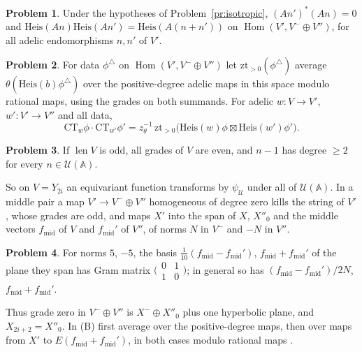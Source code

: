 \documentclass[reqno]{amsart}
\theoremstyle{definition}
\newtheorem{problem}{Problem}[section]
\theoremstyle{plain}
\theoremstyle{remark}
\newcommand{\A}{\mathbb{A}}
\newcommand{\Uc}{\mathcal{U}}
\newcommand{\Hom}{\operatorname{Hom}}
\newcommand{\Heis}{\mathrm{Heis}}
\newcommand{\CT}{\mathrm{CT}}
\newcommand{\zt}{\mathrm{zt}}
\newcommand{\len}{\operatorname{len}}
\newcommand{\fm}{f_{\mathrm{mid}}}
\begin{document}
\begin{problem}\label{pr:commute}
Under the hypotheses of Problem~\ref{pr:isotropic}, \((An')^*(An) = 0\) and \(\Heis(An)\Heis(An') = \Heis(A(n + n'))\) on \(\Hom(V', V^- \oplus V'')\), for all adelic endomorphisms \(n, n'\) of \(V'\).
\end{problem}

\begin{problem}\label{pr:ct-product}
For data \(\phi^\triangle\) on \(\Hom(V',V^-\oplus V'')\) let \(\zt_{>0}(\phi^\triangle)\) average \(\theta(\Heis(b)\phi^\triangle)\) over the positive-degree adelic maps in this space modulo rational maps, using the grades on both summands.  For adelic \(w:V\to V'\), \(w':V'\to V''\) and all data,
\[
  \CT_w \phi \cdot \CT_{w'} \phi' = z_\theta^{-1}\,\zt_{>0}\bigl(\Heis(w)\phi \boxtimes \Heis(w')\phi'\bigr) .
\]
\end{problem}

\begin{problem}\label{pr:odd}
If \(\len V\) is odd, all grades of \(V\) are even, and \(n - 1\) has degree \(\ge 2\) for every \(n \in \Uc(\A)\).
\end{problem}

So on \(V = Y_{2i}\) an equivariant function transforms by \(\psi_\Uc\) under all of \(\Uc(\A)\).  In a middle pair a map \(V' \to V^- \oplus V''\) homogeneous of degree zero kills the string of \(V'\), whose grades are odd, and maps \(X'\) into the span of \(X\), \(X''_0\) and the middle vectors \(\fm\) of \(V\) and \(\fm'\) of \(V''\), of norms \(N\) in \(V^-\) and \(-N\) in \(V''\).

\begin{problem}\label{pr:plane}
For norms \(5\), \(-5\), the basis \(\tfrac1{10}(\fm - \fm')\), \(\fm + \fm'\) of the plane they span has Gram matrix \(\bigl(\begin{smallmatrix} 0&1\\ 1&0 \end{smallmatrix}\bigr)\); in general so has \((\fm - \fm')/2N\), \(\fm + \fm'\).
\end{problem}

Thus grade zero in \(V^-\oplus V''\) is \(X^-\oplus X''_0\) plus one hyperbolic plane, and \(X_{2i+2}=X''_0\).  In (B) first average over the positive-degree maps, then over maps from \(X'\) to \(E(\fm+\fm')\), in both cases modulo rational maps \cite[UnfoldingStages, lines 519--541]{GL}.
\end{document}
